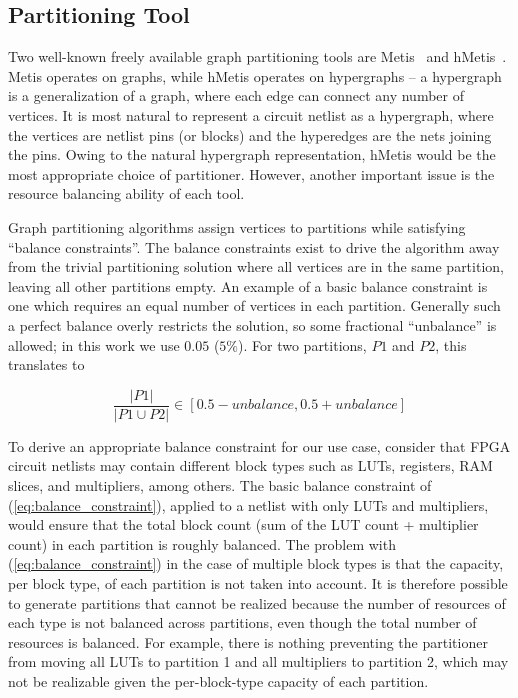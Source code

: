 \subsection{Partitioning Tool}
Two well-known freely available graph partitioning tools are Metis~\cite{karypis1998multilevelmetis} and hMetis~\cite{karypis1999multilevelhmetis}. Metis operates on graphs, while hMetis operates on hypergraphs -- a hypergraph is a generalization of a graph, where each edge can connect any number of vertices. It is most natural to represent a circuit netlist as a hypergraph, where the vertices are netlist pins (or blocks) and the hyperedges are the nets joining the pins. Owing to the natural hypergraph representation, hMetis would be the most appropriate choice of partitioner. However, another important issue is the resource balancing ability of each tool.

Graph partitioning algorithms assign vertices to partitions while satisfying ``balance constraints''. The balance constraints exist to drive the algorithm away from the trivial partitioning solution where all vertices are in the same partition, leaving all other partitions empty. An example of a basic balance constraint is one which requires an equal number of vertices in each partition. Generally such a perfect balance overly restricts the solution, so some fractional ``unbalance'' is allowed; in this work we use $0.05$ ($5\%$). For two partitions, $P1$ and $P2$, this translates to~\cite{karypismanual}

\begin{equation}\label{eq:balance_constraint}
\frac{|P1|}{|P1 \cup P2|} \in [0.5 - unbalance, 0.5 + unbalance]
\end{equation}

To derive an appropriate balance constraint for our use case, consider that FPGA circuit netlists may contain different block types such as LUTs, registers, RAM slices, and multipliers, among others. The basic balance constraint of (\ref{eq:balance_constraint}), applied to a netlist with only LUTs and multipliers, would ensure that the total block count (sum of the LUT count + multiplier count) in each partition is roughly balanced. The problem with (\ref{eq:balance_constraint}) in the case of multiple block types is that the capacity, per block type, of each partition is not taken into account. It is therefore possible to generate partitions that cannot be realized because the number of resources of each type is not balanced across partitions, even though the total number of resources is balanced. For example, there is nothing preventing the partitioner from moving all LUTs to partition 1 and all multipliers to partition 2, which may not be realizable given the per-block-type capacity of each partition.

